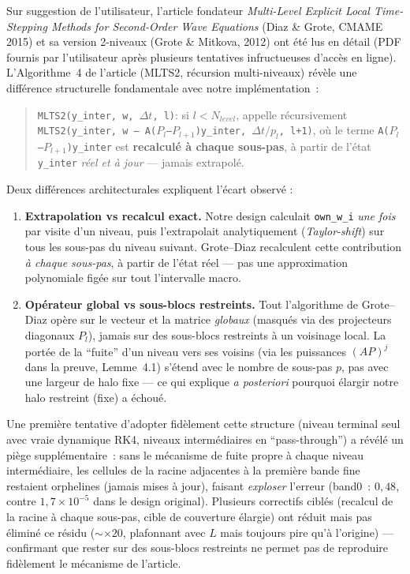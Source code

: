 \documentclass[11pt]{article}
\newcommand{\code}[1]{\texttt{#1}}
\begin{document}
Sur suggestion de l'utilisateur, l'article fondateur
\emph{Multi-Level Explicit Local Time-Stepping Methods for Second-Order
Wave Equations} (Diaz \& Grote, CMAME 2015) et sa version 2-niveaux
(Grote \& Mitkova, 2012) ont été lus en détail (PDF fournis par
l'utilisateur après plusieurs tentatives infructueuses d'accès en
ligne). L'Algorithme~4 de l'article (MLTS2, récursion multi-niveaux)
révèle une différence structurelle fondamentale avec notre
implémentation~:
\begin{quote}
\code{MLTS2(y\_inter, w, $\Delta t$, l)}: si $l<N_{level}$, appelle
récursivement \code{MLTS2(y\_inter, w -- A($P_l$--$P_{l+1}$)y\_inter,
$\Delta t/p_l$, l+1)}, où le terme \code{A($P_l$--$P_{l+1}$)y\_inter}
est \textbf{recalculé à chaque sous-pas}, à partir de l'état
\code{y\_inter} \emph{réel et à jour} --- jamais extrapolé.
\end{quote}
Deux différences architecturales expliquent l'écart observé :
\begin{enumerate}
  \item \textbf{Extrapolation vs recalcul exact.} Notre design calculait
  \code{own\_w\_i} \emph{une fois} par visite d'un niveau, puis
  l'extrapolait analytiquement (\emph{Taylor-shift}) sur tous les
  sous-pas du niveau suivant. Grote--Diaz recalculent cette contribution
  \emph{à chaque sous-pas}, à partir de l'état réel --- pas une
  approximation polynomiale figée sur tout l'intervalle macro.
  \item \textbf{Opérateur global vs sous-blocs restreints.} Tout
  l'algorithme de Grote--Diaz opère sur le vecteur et la matrice
  \emph{globaux} (masqués via des projecteurs diagonaux $P_l$), jamais
  sur des sous-blocs restreints à un voisinage local. La portée de la
  ``fuite'' d'un niveau vers ses voisins (via les puissances
  $(AP)^j$ dans la preuve, Lemme~4.1) s'étend avec le nombre de
  sous-pas $p$, pas avec une largeur de halo fixe --- ce qui explique
  \emph{a posteriori} pourquoi élargir notre halo restreint (fixe) a
  échoué.
\end{enumerate}
Une première tentative d'adopter fidèlement cette structure (niveau
terminal seul avec vraie dynamique RK4, niveaux intermédiaires en
``pass-through'') a révélé un piège supplémentaire~: sans le mécanisme
de fuite propre à chaque niveau intermédiaire, les cellules de la
racine adjacentes à la première bande fine restaient orphelines (jamais
mises à jour), faisant \emph{exploser} l'erreur (band0~: $0{,}48$,
contre $1{,}7\times10^{-5}$ dans le design original). Plusieurs correctifs
ciblés (recalcul de la racine à chaque sous-pas, cible de couverture
élargie) ont réduit mais pas éliminé ce résidu ($\sim\times20$,
plafonnant avec $L$ mais toujours pire qu'à l'origine) --- confirmant
que rester sur des sous-blocs restreints ne permet pas de reproduire
fidèlement le mécanisme de l'article.
\end{document}
